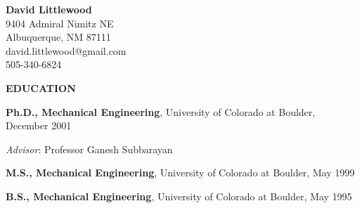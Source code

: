 \documentclass[11pt]{article}
\newlength{\itemskip} \setlength{\itemskip}{0.0in}
\newlength{\sectionskip} \setlength{\sectionskip}{0.2in}
\newlength{\listskip} \setlength{\listskip}{0.05in}
\newlength{\minipagewidth} \setlength{\minipagewidth}{6.25in} %
\begin{document}
\thispagestyle{empty}

\begin{center}
{\LARGE \textbf{David Littlewood}} \\
\vspace{0.1in}
%
9404 Admiral Nimitz NE \\
Albuquerque, NM 87111 \\
david.littlewood@gmail.com \\
505-340-6824 \\
\vspace{0.3in}
%
\end{center}

\noindent
{\large \textbf{EDUCATION}}
\vspace{\sectionskip}

\begin{minipage}{\minipagewidth}
\textbf{Ph.D., Mechanical Engineering}, University of Colorado at Boulder, December 2001 %

\vspace{\listskip}
{\it Advisor}: Professor Ganesh Subbarayan
\end{minipage}\vspace{\parskip}

\begin{minipage}{\minipagewidth}
\textbf{M.S., Mechanical Engineering}, University of Colorado at Boulder, May 1999 %
\end{minipage}\vspace{\itemskip}

\begin{minipage}{\minipagewidth}
\textbf{B.S., Mechanical Engineering}, University of Colorado at Boulder, May 1995 %
\end{minipage}
\end{document}
